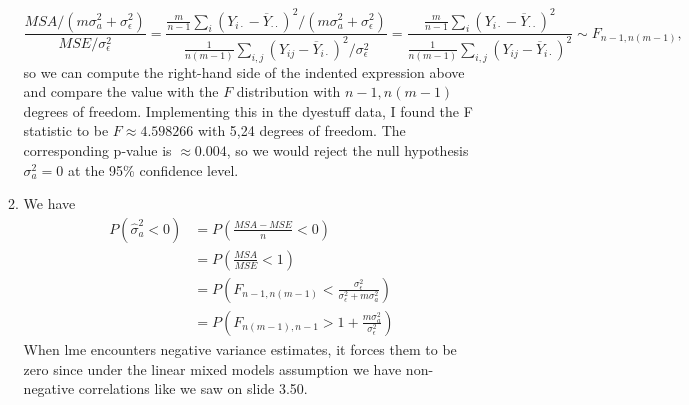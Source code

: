 \documentclass[11pt]{article}
\begin{document}
\begin{enumerate}
\begin{enumerate}
			\[
				\frac{MSA/(m\sigma_a^2 + \sigma_\epsilon^2)}{MSE/\sigma_\epsilon^2} =\frac{\frac{m}{n-1}\sum_i (Y_{i\cdot}-\overline{Y}_{\cdot\cdot})^2/(m\sigma_a^2+\sigma_\epsilon^2)}{\frac{1}{n(m-1)}\sum_{i,j}(Y_{ij}-\overline{Y}_{i\cdot})^2/\sigma_\epsilon^2} = 				\frac{\frac{m}{n-1}\sum_i (Y_{i\cdot}-\overline{Y}_{\cdot\cdot})^2}{\frac{1}{n(m-1)}\sum_{i,j}(Y_{ij}-\overline{Y}_{i\cdot})^2} \sim F_{n-1,n(m-1)},
			\]
			so we can compute the right-hand side of the indented expression above and compare the value with the $F$ distribution with $n-1,n(m-1)$ degrees of freedom. Implementing this in the dyestuff data, I found the F statistic to be $F \approx 4.598266$ with 5,24 degrees of freedom. The corresponding p-value is $\approx 0.004$, so we would reject the null hypothesis $\sigma_a^2=0$ at the 95\% confidence level.
			\item We have
			\begin{align*}
				P(\widehat{\sigma}_a^2 < 0) &= P\left(\frac{MSA-MSE}{n} < 0  \right) \\
				&= P\left(\frac{MSA}{MSE} <1 \right)\\
				&=  P\left(F_{n-1,n(m-1)} < \frac{\sigma_\epsilon^2}{\sigma_\epsilon^2 + m\sigma_a^2} \right) \\
				&= P\left(F_{n(m-1),n-1} > 1 + \frac{m\sigma_a^2}{\sigma_\epsilon^2} \right)
			\end{align*}
			When lme encounters negative variance estimates, it forces them to be zero since under the linear mixed models assumption we have non-negative correlations like we saw on slide 3.50.
		\end{enumerate}
	

\end{enumerate}
\end{document}
